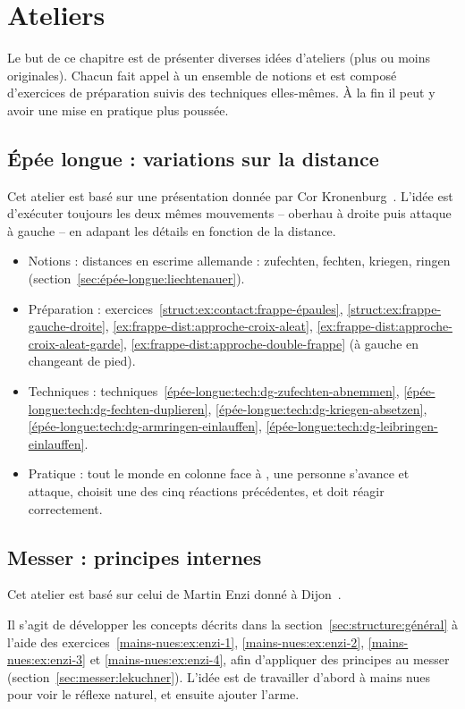 \chapter{Ateliers}

Le but de ce chapitre est de présenter diverses idées d'ateliers (plus ou moins originales).
Chacun fait appel à un ensemble de notions et est composé d'exercices de préparation suivis des techniques elles-mêmes.
À la fin il peut y avoir une mise en pratique plus poussée.


\section{Épée longue : variations sur la distance}
\label{app:ateliers:épée-longue-variations-distance}

Cet atelier est basé sur une présentation donnée par Cor Kronenburg~\cite{kronenburg:dijon:going_distance:2015}.
L'idée est d'exécuter toujours les deux mêmes mouvements – oberhau à droite puis attaque à gauche – en adapant les détails en fonction de la distance.

\begin{itemize}
	\item Notions : distances en escrime allemande : zufechten, fechten, kriegen, ringen (section~\ref{sec:épée-longue:liechtenauer}).
	\item Préparation : exercices~\ref{struct:ex:contact:frappe-épaules}, \ref{struct:ex:frappe-gauche-droite}, \ref{ex:frappe-dist:approche-croix-aleat}, \ref{ex:frappe-dist:approche-croix-aleat-garde}, \ref{ex:frappe-dist:approche-double-frappe} (à gauche en changeant de pied).
	\item Techniques : techniques~\ref{épée-longue:tech:dg-zufechten-abnemmen}, \ref{épée-longue:tech:dg-fechten-duplieren}, \ref{épée-longue:tech:dg-kriegen-absetzen}, \ref{épée-longue:tech:dg-armringen-einlauffen}, \ref{épée-longue:tech:dg-leibringen-einlauffen}.
	\item Pratique : tout le monde en colonne face à \D, une personne \A s'avance et attaque, \D choisit une des cinq réactions précédentes, et \A doit réagir correctement.
\end{itemize}


\section{Messer : principes internes}


Cet atelier est basé sur celui de Martin Enzi donné à Dijon~\cite{enzi:dijon:messer_inner:2015}.

Il s'agit de développer les concepts décrits dans la section~\ref{sec:structure:général} à l'aide des exercices~\ref{mains-nues:ex:enzi-1}, \ref{mains-nues:ex:enzi-2}, \ref{mains-nues:ex:enzi-3} et \ref{mains-nues:ex:enzi-4}, afin d'appliquer des principes au messer (section~\ref{sec:messer:lekuchner}).
L'idée est de travailler d'abord à mains nues pour voir le réflexe naturel, et ensuite ajouter l'arme.
